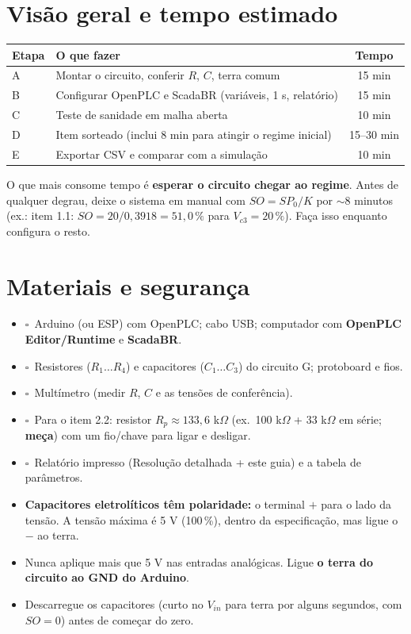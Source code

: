 \documentclass[11pt,a4paper]{article}
\newcommand{\Vc}[1]{V_{c#1}}
\newcommand{\chk}{$\square$\ }
\begin{document}
\section{Visão geral e tempo estimado}
\begin{center}\small\begin{tabular}{lp{7.5cm}c}\toprule Etapa & O que fazer & Tempo\\\midrule
A & Montar o circuito, conferir $R$, $C$, terra comum & 15 min\\
B & Configurar OpenPLC e ScadaBR (variáveis, 1 s, relatório) & 15 min\\
C & Teste de sanidade em malha aberta & 10 min\\
D & Item sorteado (inclui 8 min para atingir o regime inicial) & 15--30 min\\
E & Exportar CSV e comparar com a simulação & 10 min\\\bottomrule\end{tabular}\end{center}
\begin{dica}O que mais consome tempo é \textbf{esperar o circuito chegar ao regime}. Antes de qualquer degrau, deixe o sistema em manual com $SO=SP_0/K$ por $\sim$8 minutos (ex.: item 1.1: $SO=20/0{,}3918=51{,}0\,\%$ para $\Vc3=20\,\%$). Faça isso enquanto configura o resto.\end{dica}

\section{Materiais e segurança}
\begin{itemize}
\item \chk Arduino (ou ESP) com OpenPLC; cabo USB; computador com \textbf{OpenPLC Editor/Runtime} e \textbf{ScadaBR}.
\item \chk Resistores ($R_1\ldots R_4$) e capacitores ($C_1\ldots C_3$) do circuito G; protoboard e fios.
\item \chk Multímetro (medir $R$, $C$ e as tensões de conferência).
\item \chk Para o item 2.2: resistor $R_p\approx133{,}6$ k$\Omega$ (ex.\ 100 k$\Omega$ + 33 k$\Omega$ em série; \textbf{meça}) com um fio/chave para ligar e desligar.
\item \chk Relatório impresso (Resolução detalhada + este guia) e a tabela de parâmetros.
\end{itemize}
\begin{alerta}
\begin{itemize}
\item \textbf{Capacitores eletrolíticos têm polaridade:} o terminal $+$ para o lado da tensão. A tensão máxima é 5 V (100\,\%), dentro da especificação, mas ligue o $-$ ao terra.
\item Nunca aplique mais que 5 V nas entradas analógicas. Ligue \textbf{o terra do circuito ao GND do Arduino}.
\item Descarregue os capacitores (curto no $V_{in}$ para terra por alguns segundos, com $SO=0$) antes de começar do zero.
\end{itemize}\end{alerta}
\end{document}
